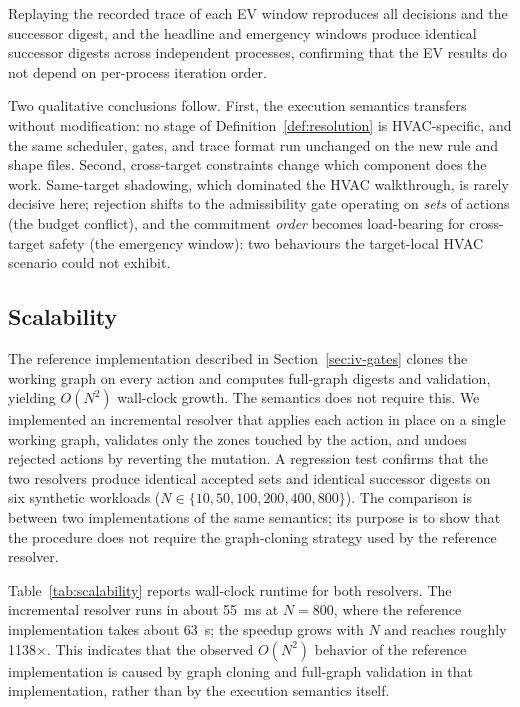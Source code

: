 \documentclass{ieeeaccess}
\theoremstyle{definition}
\theoremstyle{plain}
\theoremstyle{remark}
\begin{document}
Replaying the recorded trace of each EV window reproduces all decisions and the
successor digest, and the headline and emergency windows produce identical
successor digests across independent processes, confirming that the EV results
do not depend on per-process iteration order.

Two qualitative conclusions follow. First, the execution semantics transfers
without modification: no stage of Definition~\ref{def:resolution} is
HVAC-specific, and the same scheduler, gates, and trace format run unchanged on
the new rule and shape files. Second, cross-target constraints change which
component does the work. Same-target shadowing, which dominated the HVAC
walkthrough, is rarely decisive here; rejection shifts to the admissibility gate
operating on \emph{sets} of actions (the budget conflict), and the commitment
\emph{order} becomes load-bearing for cross-target safety (the emergency
window): two behaviours the target-local HVAC scenario could not exhibit.

\subsection{Scalability}
\label{sec:eval:scalability}

The reference implementation described in Section~\ref{sec:iv-gates} clones the working graph on every action and computes full-graph digests and validation, yielding $O(N^2)$ wall-clock growth. The semantics does not require this. We implemented an incremental resolver that applies each action in place on a single working graph, validates only the zones touched by the action, and undoes rejected actions by reverting the mutation. A regression test confirms that the two resolvers produce identical accepted sets and identical successor digests on six synthetic workloads ($N\in\{10, 50, 100, 200, 400, 800\}$). The comparison is between two implementations of the same semantics; its purpose is to show that the procedure does not require the graph-cloning strategy used by the reference resolver.

Table~\ref{tab:scalability} reports wall-clock runtime for both resolvers. The incremental resolver runs in about 55~ms at $N{=}800$, where the reference implementation takes about 63~s; the speedup grows with $N$ and reaches roughly 1138$\times$. This indicates that the observed $O(N^2)$ behavior of the reference implementation is caused by graph cloning and full-graph validation in that implementation, rather than by the execution semantics itself.
\end{document}

